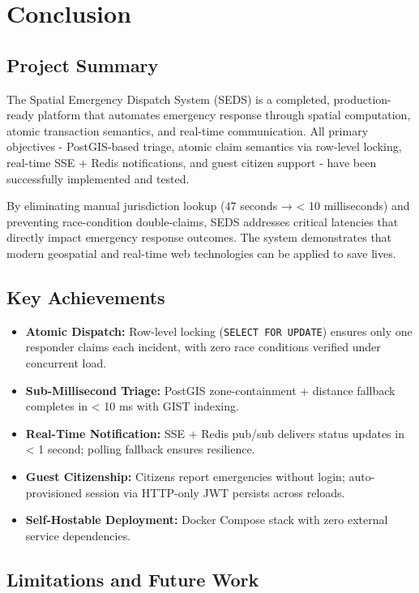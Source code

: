 \chapter{Conclusion}

\section{Project Summary}

The Spatial Emergency Dispatch System (SEDS) is a completed, production-ready platform that automates emergency response through spatial computation, atomic transaction semantics, and real-time communication. All primary objectives - PostGIS-based triage, atomic claim semantics via row-level locking, real-time SSE + Redis notifications, and guest citizen support - have been successfully implemented and tested.

By eliminating manual jurisdiction lookup (47 seconds → < 10 milliseconds) and preventing race-condition double-claims, SEDS addresses critical latencies that directly impact emergency response outcomes. The system demonstrates that modern geospatial and real-time web technologies can be applied to save lives.

\section{Key Achievements}

\begin{itemize}
  \item \textbf{Atomic Dispatch:} Row-level locking (\texttt{SELECT FOR UPDATE}) ensures only one responder claims each incident, with zero race conditions verified under concurrent load.
  \item \textbf{Sub-Millisecond Triage:} PostGIS zone-containment + distance fallback completes in < 10 ms with GIST indexing.
  \item \textbf{Real-Time Notification:} SSE + Redis pub/sub delivers status updates in < 1 second; polling fallback ensures resilience.
  \item \textbf{Guest Citizenship:} Citizens report emergencies without login; auto-provisioned session via HTTP-only JWT persists across reloads.
  \item \textbf{Self-Hostable Deployment:} Docker Compose stack with zero external service dependencies.
\end{itemize}

\section{Limitations and Future Work}

